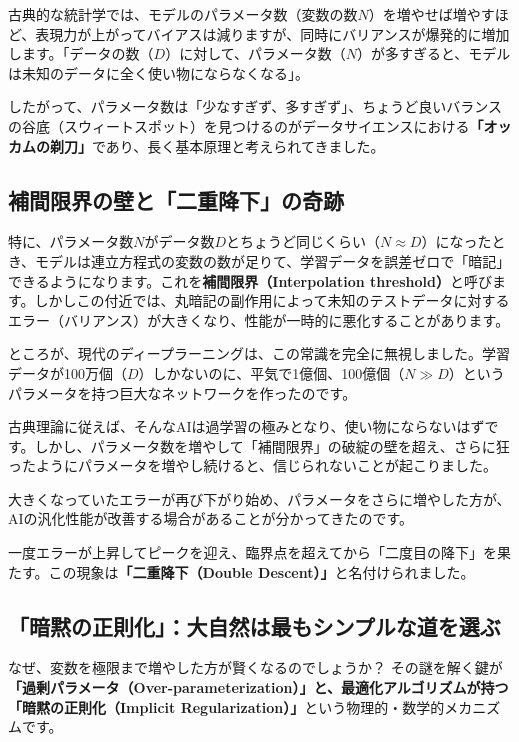 古典的な統計学では、モデルのパラメータ数（変数の数\(N\)）を増やせば増やすほど、表現力が上がってバイアスは減りますが、同時にバリアンスが爆発的に増加します。「データの数（\(D\)）に対して、パラメータ数（\(N\)）が多すぎると、モデルは未知のデータに全く使い物にならなくなる」。

したがって、パラメータ数は「少なすぎず、多すぎず」、ちょうど良いバランスの谷底（スウィートスポット）を見つけるのがデータサイエンスにおける\textbf{「オッカムの剃刀」}であり、長く基本原理と考えられてきました。

\subsection{補間限界の壁と「二重降下」の奇跡}

特に、パラメータ数\(N\)がデータ数\(D\)とちょうど同じくらい（\(N \approx D\)）になったとき、モデルは連立方程式の変数の数が足りて、学習データを誤差ゼロで「暗記」できるようになります。これを\textbf{補間限界（Interpolation threshold）}と呼びます。しかしこの付近では、丸暗記の副作用によって未知のテストデータに対するエラー（バリアンス）が大きくなり、性能が一時的に悪化することがあります。

ところが、現代のディープラーニングは、この常識を完全に無視しました。学習データが100万個（\(D\)）しかないのに、平気で1億個、100億個（\(N \gg D\)）というパラメータを持つ巨大なネットワークを作ったのです。

古典理論に従えば、そんなAIは過学習の極みとなり、使い物にならないはずです。しかし、パラメータ数を増やして「補間限界」の破綻の壁を超え、さらに狂ったようにパラメータを増やし続けると、信じられないことが起こりました。

大きくなっていたエラーが再び下がり始め、パラメータをさらに増やした方が、AIの汎化性能が改善する場合があることが分かってきたのです。

一度エラーが上昇してピークを迎え、臨界点を超えてから「二度目の降下」を果たす。この現象は\textbf{「二重降下（Double Descent）」}と名付けられました。

\subsection{「暗黙の正則化」：大自然は最もシンプルな道を選ぶ}

なぜ、変数を極限まで増やした方が賢くなるのでしょうか？ その謎を解く鍵が\textbf{「過剰パラメータ（Over-parameterization）」と、最適化アルゴリズムが持つ「暗黙の正則化（Implicit Regularization）」}という物理的・数学的メカニズムです。

